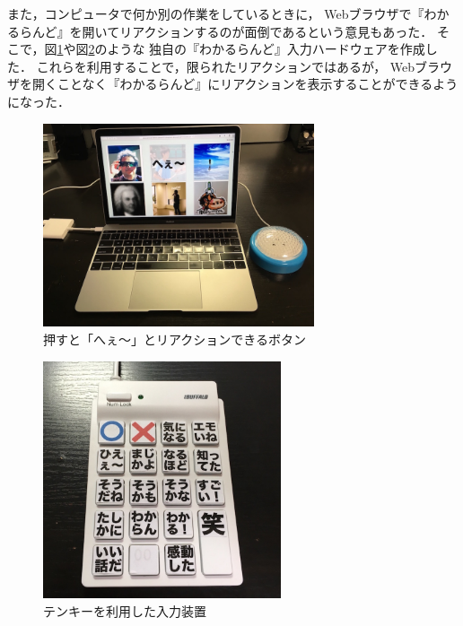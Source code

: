 また，コンピュータで何か別の作業をしているときに，
Webブラウザで『わかるらんど』を開いてリアクションするのが面倒であるという意見もあった．
そこで，図\ref{heebutton}や図\ref{10key}のような
独自の『わかるらんど』入力ハードウェアを作成した．
これらを利用することで，限られたリアクションではあるが，
Webブラウザを開くことなく『わかるらんど』にリアクションを表示することができるようになった．

\begin{figure}[H]
\centering
\includegraphics[width=8cm]{images/heebutton.png}
\caption{押すと「へぇ〜」とリアクションできるボタン}
\label{heebutton}
\end{figure}

\begin{figure}[H]
\centering
\includegraphics[width=7cm]{images/10key.png}
\caption{テンキーを利用した入力装置}
\label{10key}
\end{figure}